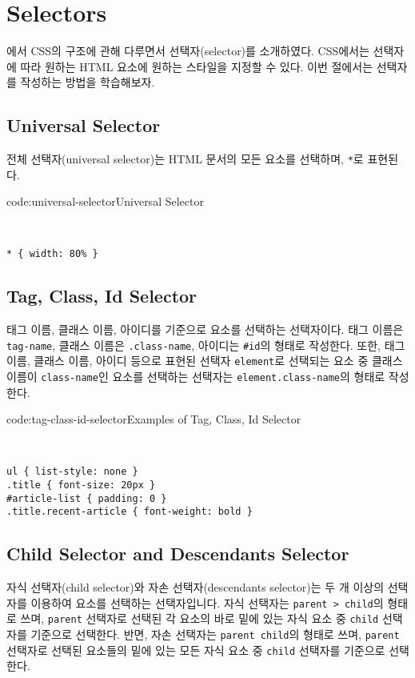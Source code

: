 \section{Selectors} \label{sect:selectors}

에서 CSS의 구조에 관해 다루면서 선택자(selector)를 소개하였다. CSS에서는 선택자에 따라 원하는 HTML 요소에 원하는 스타일을 지정할 수 있다. 이번 절에서는 선택자를 작성하는 방법을 학습해보자. 

\subsection*{Universal Selector}

전체 선택자(universal selector)는 HTML 문서의 모든 요소를 선택하며, \verb|*|로 표현된다.

\begin{codeenv}{code:universal-selector}{Universal Selector}\begin{verbatim}


* { width: 80% }
\end{verbatim}
\end{codeenv}

\subsection*{Tag, Class, Id Selector}
태그 이름, 클래스 이름, 아이디를 기준으로 요소를 선택하는 선택자이다. 태그 이름은 \verb|tag-name|, 클래스 이름은 \verb|.class-name|, 아이디는 \verb|#id|의 형태로 작성한다. 또한, 태그 이름, 클래스 이름, 아이디 등으로 표현된 선택자 \verb|element|로 선택되는 요소 중 클래스 이름이 \verb|class-name|인 요소를 선택하는 선택자는 \verb|element.class-name|의 형태로 작성한다.

\begin{codeenv}{code:tag-class-id-selector}{Examples of Tag, Class, Id Selector}\begin{verbatim}


ul { list-style: none }
.title { font-size: 20px }
#article-list { padding: 0 }
.title.recent-article { font-weight: bold }
\end{verbatim}
\end{codeenv}

\subsection*{Child Selector and Descendants Selector}
자식 선택자(child selector)와 자손 선택자(descendants selector)는 두 개 이상의 선택자를 이용하여 요소를 선택하는 선택자입니다. 자식 선택자는 \verb|parent > child|의 형태로 쓰며, \verb|parent| 선택자로 선택된 각 요소의 바로 밑에 있는 자식 요소 중 \verb|child| 선택자를 기준으로 선택한다. 반면, 자손 선택자는 \verb|parent child|의 형태로 쓰며, \verb|parent| 선택자로 선택된 요소들의 밑에 있는 모든 자식 요소 중 \verb|child| 선택자를 기준으로 선택한다.

